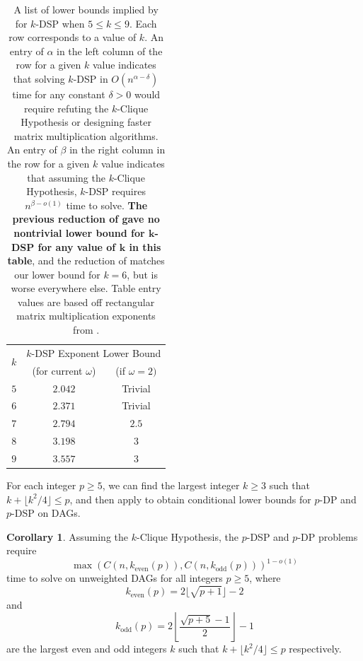 \documentclass[11pt]{article}
\theoremstyle{definition}
\newtheorem{corollary}[theorem]{Corollary}
\begin{document}
\begin{table}[t]

    \centering
    \begin{tabular}{|c|c|c|}
    \hline
         \multirow{2}{*}{$k$} & \multicolumn{2}{|c|}{\textsf{$k$-DSP} Exponent Lower Bound}  \\ %
         & (for current $\omega$) & (if $\omega = 2)$ \\
         \hline
         $5$ & $2.042$ & Trivial \\

         $6$ &  $2.371$ & Trivial \\
         $7$ & $2.794$ & $2.5$ \\
         $8$ & $3.198$ & $3$ \\
         $9$ & $3.557$ & $3$ \\
         \hline
    \end{tabular}
    \caption{A list of lower bounds implied by  for \textsf{$k$-DSP} when $5\le k\le 9$. 
    Each row corresponds to a value of $k$.
    An entry of $\alpha$ in the left column of the row for a given $k$ value indicates that solving \textsf{$k$-DSP} in $O(n^{\alpha-\delta})$ time for any constant $\delta > 0$ would require refuting the \textsf{$k$-Clique Hypothesis} or designing faster matrix multiplication algorithms. 
    An entry of $\beta$ in the right column in the row for a given $k$ value indicates that assuming the \textsf{$k$-Clique Hypothesis}, \textsf{$k$-DSP} requires $n^{\beta - o(1)}$ time to solve.
    \textbf{The previous reduction of \cite{Geometric-Lens-conf} gave no nontrivial lower bound for \textsf{$\boldsymbol{k}$-DSP} for any value of $\boldsymbol{k}$  in this table}, and the reduction of \cite{Slivkins2010} matches our lower bound for $k=6$, but is  worse everywhere else.
    Table entry values are based off rectangular matrix multiplication exponents from \cite[Table 1]{even-faster-matrix-mult}.
    }
\label{table:DSP-small-values}
\end{table}

For each integer $p\ge 5$, we can find the largest integer $k\ge 3$ such that $k + \lfloor k^2/4\rfloor \le p$, and then apply  to obtain conditional lower bounds for \textsf{$p$-DP} and \textsf{$p$-DSP} on DAGs.

\begin{corollary}\label{cor:dp}
Assuming the \textsf{$k$-Clique Hypothesis}, the \textsf{$p$-DSP} and \textsf{$p$-DP} problems require 
\[\max\left(C(n,k_{\text{even}}(p)), C(n,k_{\text{odd}}(p))\right)^{1-o(1)}\]
time to solve on unweighted DAGs for all integers $p\ge 5$, where 
    \[k_{\text{even}}(p) = 2\lfloor\sqrt{p+1}\rfloor -2\]
and
    \[k_{\text{odd}}(p) = 2\left\lfloor\frac{\sqrt{p+5}-1}{2}\right\rfloor - 1\]
    are the largest even and odd integers $k$ such that $k + \lfloor k^2/4\rfloor \le p$ respectively.
\end{corollary}
\end{document}
